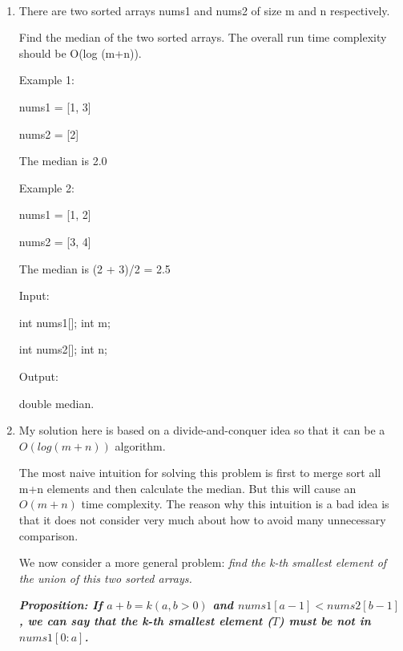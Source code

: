 \documentclass[12pt,a4paper]{article}
\makeatletter
\newtheorem*{solution}{Solution}
\renewenvironment{solution}[1][Solution] {\par\pushQED{\qed}\normalfont\topsep6\p@\@plus6\p@\relax\trivlist\item[\hskip\labelsep\bfseries#1\@addpunct{.}]\ignorespaces}{\popQED\endtrivlist\@endpefalse} \makeatother
\makeatother
\begin{document}
\noindent

\noindent{}

~\\
\begin{enumerate}

\item There are two sorted arrays nums1 and nums2 of size m and n respectively.

Find the median of the two sorted arrays. The overall run time complexity should be O(log (m+n)).

Example 1:

nums1 = [1, 3]

nums2 = [2]

The median is 2.0

Example 2:

nums1 = [1, 2]

nums2 = [3, 4]

The median is (2 + 3)/2 = 2.5

Input:

int nums1[]; int m;

int nums2[]; int n;

Output:

double median.



\begin{solution}  
My solution here is based on a divide-and-conquer idea so that it can be a $O(log(m+n))$ algorithm. 


The most naive intuition for solving this problem is first to merge sort all m+n elements and then calculate the median. But this will cause an $O(m+n)$ time complexity. The reason why this intuition is a bad idea is that it does not consider very much about how to avoid many unnecessary comparison.


We now consider a more general problem: \emph{find the k-th smallest element of the union of this two sorted arrays.}





\emph{\bf{Proposition: If $a+b=k (a,b>0)$ and $nums1[a-1] < nums2[b-1]$, we can say that the k-th smallest element ($T$) must be not in $nums1[0:a]$.}}


\end{solution}
\end{enumerate}
\end{document}
